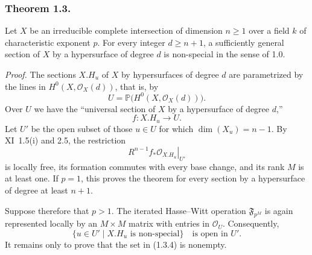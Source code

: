 \subsubsection*{Theorem 1.3.}
Let $X$ be an irreducible complete intersection of dimension $n\geq1$ over
a field $k$ of characteristic exponent $p$.  For every integer $d\geq n+1$,
a sufficiently general section of $X$ by a hypersurface of degree $d$ is
non-special in the sense of 1.0.

\medskip
\noindent\emph{Proof.}
The sections $X.H_u$ of $X$ by hypersurfaces of degree $d$ are parametrized
by the lines in $H^0(X,\mathcal O_X(d))$, that is, by
\begin{equation}\tag{1.3.1}
U=\mathbb P\bigl(H^0(X,\mathcal O_X(d))\bigr).
\end{equation}
Over $U$ we have the ``universal section of $X$ by a hypersurface of degree
$d$,''
\begin{equation}\tag{1.3.2}
f:X.H_u\longrightarrow U.
\end{equation}
Let $U'$ be the open subset of those $u\in U$ for which
$\dim(X_u)=n-1$.  By XI~1.5(i) and 2.5, the restriction
\begin{equation}\tag{1.3.3}
\left.R^{n-1}f_*\mathcal O_{X.H_u}\right|_{U'}
\end{equation}
is locally free, its formation commutes with every base change, and its rank
$M$ is at least one.  If $p=1$, this proves the theorem for every section by
a hypersurface of degree at least $n+1$.

Suppose therefore that $p>1$.  The iterated Hasse--Witt operation
$\mathfrak F_{p^M}$ is again represented locally by an $M\times M$ matrix
with entries in $\mathcal O_U$.  Consequently,
\begin{equation}\tag{1.3.4}
\{u\in U'\mid X.H_u\text{ is non-special}\}
\quad\text{is open in }U'.
\end{equation}
It remains only to prove that the set in (1.3.4) is nonempty.

